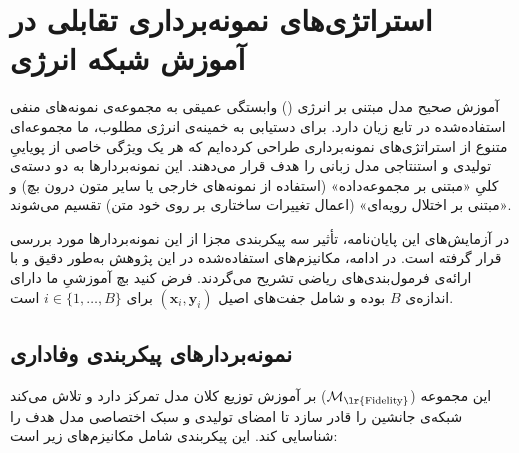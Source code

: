 
\section{استراتژی‌های نمونه‌برداری تقابلی در آموزش شبکه انرژی}\label{app:appendix_negative_samplers}

آموزش صحیح مدل مبتنی بر انرژی () وابستگی عمیقی به مجموعه‌ی نمونه‌های منفی استفاده‌شده در تابع زیان  دارد. برای دستیابی به خمینه‌ی انرژی مطلوب، ما مجموعه‌ای متنوع از استراتژی‌های نمونه‌برداری طراحی کرده‌ایم که هر یک ویژگی خاصی از پویاییِ تولیدی و استنتاجی مدل زبانی را هدف قرار می‌دهند. این نمونه‌بردارها به دو دسته‌ی کلیِ «مبتنی بر مجموعه‌داده» (استفاده از نمونه‌های خارجی یا سایر متون درون بچ) و «مبتنی بر اختلال رویه‌ای» (اعمال تغییرات ساختاری بر روی خود متن) تقسیم می‌شوند. 

در آزمایش‌های این پایان‌نامه، تأثیر سه پیکربندی مجزا از این نمونه‌بردارها مورد بررسی قرار گرفته است. در ادامه، مکانیزم‌های استفاده‌شده در این پژوهش به‌طور دقیق و با ارائه‌ی فرمول‌بندی‌های ریاضی تشریح می‌گردند. فرض کنید بچ آموزشیِ ما دارای اندازه‌ی $B$ بوده و شامل جفت‌های اصیل $(\mathbf{x}_i, \mathbf{y}_i)$ برای $i \in \{1, \dots, B\}$ است.


\subsection{نمونه‌بردارهای پیکربندی وفاداری}

این مجموعه ($\mathcal{M}_{\text{\lr{Fidelity}}}$) بر آموزش توزیع کلان مدل تمرکز دارد و تلاش می‌کند شبکه‌ی جانشین را قادر سازد تا امضای تولیدی و سبک اختصاصی مدل هدف را شناسایی کند. این پیکربندی شامل مکانیزم‌های زیر است:

